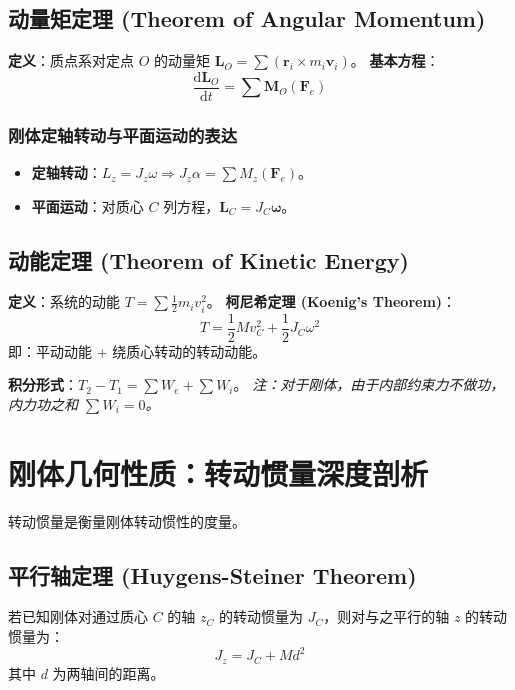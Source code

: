 \documentclass[12pt,a4paper]{article}
\newcommand{\vect}[1]{\mathbf{#1}}                   %
\newcommand{\der}[2]{\frac{\mathrm{d} #1}{\mathrm{d} #2}}  %
\begin{document}
\subsection{动量矩定理 (Theorem of Angular Momentum)}
\textbf{定义}：质点系对定点 $O$ 的动量矩 $\vect{L}_O = \sum (\vect{r}_i \times m_i \vect{v}_i)$。
\textbf{基本方程}：
\begin{equation}
    \der{\vect{L}_O}{t} = \sum \vect{M}_O(\vect{F}_e)
\end{equation}

\subsubsection{刚体定轴转动与平面运动的表达}
\begin{itemize}
    \item \textbf{定轴转动}：$L_z = J_z \omega \Rightarrow J_z \alpha = \sum M_z(\vect{F}_e)$。
    \item \textbf{平面运动}：对质心 $C$ 列方程，$\vect{L}_C = J_C \vect{\omega}$。
\end{itemize}

\subsection{动能定理 (Theorem of Kinetic Energy)}
\textbf{定义}：系统的动能 $T = \sum \frac{1}{2} m_i v_i^2$。
\textbf{柯尼希定理 (Koenig's Theorem)}：
\begin{equation}
    T = \frac{1}{2} M v_C^2 + \frac{1}{2} J_C \omega^2
\end{equation}
即：平动动能 + 绕质心转动的转动动能。

\textbf{积分形式}：$T_2 - T_1 = \sum W_e + \sum W_i$。
\textit{注：对于刚体，由于内部约束力不做功，内力功之和 $\sum W_i = 0$。}

\section{刚体几何性质：转动惯量深度剖析}

转动惯量是衡量刚体转动惯性的度量。

\subsection{平行轴定理 (Huygens-Steiner Theorem)}
若已知刚体对通过质心 $C$ 的轴 $z_C$ 的转动惯量为 $J_C$，则对与之平行的轴 $z$ 的转动惯量为：
\begin{equation}
    J_z = J_C + Md^2
\end{equation}
其中 $d$ 为两轴间的距离。
\end{document}
